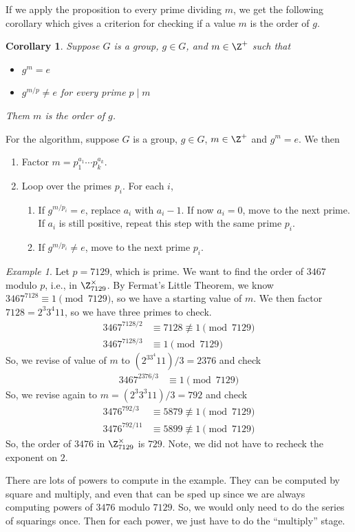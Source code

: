 \documentclass[12pt]{amsart}
\theoremstyle{plain}
\newtheorem{cor}[thm]{Corollary}
\theoremstyle{definition}
\theoremstyle{remark}
\newtheorem*{exam}{Example}
\begin{document}
If we apply the proposition to every prime dividing $m$, we get the
following corollary which gives a criterion for checking if a value
$m$ is the order of $g$.
\begin{cor} \label{order-check}
  Suppose $G$ is a group, $g\in G$, and $m\in\Z^+$ such that
  \begin{itemize}
  \item $g^m=e$
  \item $g^{m/p}\neq e$ for every prime $p\mid m$
  \end{itemize}
  Them $m$ is the order of $g$.
\end{cor}

For the algorithm, suppose $G$ is a group, $g\in G$, $m\in\Z^+$ and
$g^m=e$.  We then
\begin{enumerate}
\item Factor $m=p_1^{a_1}\cdots p_k^{a_k}$.
\item Loop over the primes $p_i$.  For each $i$,
  \begin{enumerate}
  \item If $g^{m/p_i}=e$, replace $a_i$ with $a_i-1$.  If now $a_i=0$,
    move to the next prime.  If $a_i$ is still positive, repeat this
    step with the same prime $p_i$.
    \item If $g^{m/p_i}\neq e$, move to the next prime $p_i$.
  \end{enumerate}
\end{enumerate}

\begin{exam}
 Let  $p=7129$, which is prime.  We want to find the order of $3467$
 modulo $p$, i.e., in $\Z_{7129}^\times$.  By Fermat's Little Theorem,
 we know $3467^{7128}\equiv 1\pmod{7129}$, so we have a starting value
 of $m$.  We then factor $7128=2^3 3^4 11$, so we have three primes to
 check.
\begin{align*}
  3467^{7128/2}&\equiv 7128\not\equiv 1\pmod{7129} \\
    3467^{7128/3}&\equiv 1\pmod{7129}
\end{align*}
So, we revise of value of $m$ to $(2^33^4 11)/3=2376$ and check
\begin{align*}
    3467^{2376/3}&\equiv 1\pmod{7129}
\end{align*}
So, we revise again to $m=(2^3 3^3 11)/3=792$ and check
\begin{align*}
    3476^{792/3}&\equiv 5879\not\equiv 1\pmod{7129} \\
    3476^{792/11}&\equiv 5899\not\equiv 1\pmod{7129}
\end{align*}
So, the order of $3476$ in $\Z_{7129}^\times$ is $729$.  Note, we did
not have to recheck the exponent on $2$.
\end{exam}
There are lots of powers to compute in the example.  They can be
computed by square and multiply, and even that can be sped up since we
are always computing powers of $3476$ modulo $7129$.  So, we would
only need to do the series of squarings once.  Then for each power, we
just have to do the ``multiply'' stage.
\end{document}
